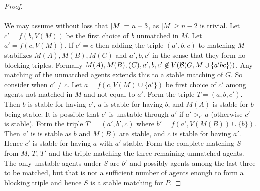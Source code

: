 \begin{proof}
\paragraph{}
We may assume without loss that $\left|M\right| = n-3$, as $|M| \geq n-2$ is trivial. Let $c' = f(b, V(M))$ be the first choice of $b$ unmatched in $M$. Let $a' = f(c, V(M))$. If $c' = c$ then adding the triple $(a', b,c)$ to matching $M$ stabilizes $M(A), M(B), M(C)$ and $a', b, c'$ in the sense that they form no blocking triples. Formally $M(A),M(B),(C), a',b,c' \not\in V(\mathcal{B}(G, M \cup \{ a'bc\}))$. Any matching of the unmatched agents extends this to a stable matching of $G$. So consider when $c' \neq c$. Let $a = f(c, V(M) \cup\{a'\})$ be first choice of $c'$ among agents not matched in $M$ and not equal to $a'$. Form the triple $T = (a, b, c')$. Then $b$ is stable for having $c'$, $a$ is stable for having $b$, and $M(A)$ is stable for $b$ being stable. It is possible that $c'$ is unstable through $a'$ if $a' >_{c'} a$ (otherwise $c'$ is stable). Form the triple $T' = (a', b', c)$ where $b'=f(a',V(M(B))\cup\{b\})$. Then $a'$ is is stable as $b$ and $M(B)$ are stable, and $c$ is stable for having $a'$. Hence $c'$ is stable for having $a$ with $a'$ stable. Form the complete matching $S$ from $M$, $T$, $T'$ and the triple matching the three remaining unmatched agents. The only unstable agents under $S$ are $b'$ and possibly agents among the last three to be matched, but that is not a sufficient number of agents enough to form a blocking triple and hence $S$ is a stable matching for $P$. 
\end{proof}
